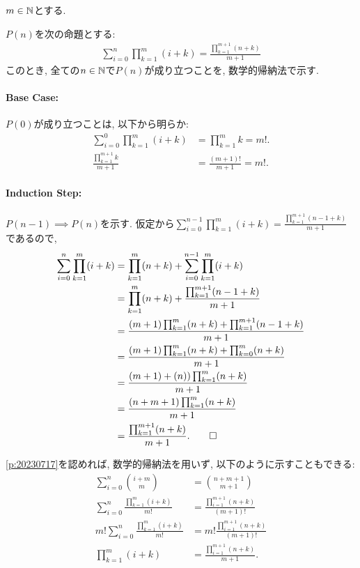 \begin{proof*}
  $m\in \mathbb{N}$とする.
  
  $P(n)$を次の命題とする:
  \begin{align*}
    \sum_{i=0}^n \prod_{k=1}^{m}(i+k)=\frac{\prod_{k=1}^{m+1}(n+k)}{m+1}
  \end{align*}
  このとき,
  全ての$n\in\mathbb{N}$で$P(n)$が成り立つことを,
  数学的帰納法で示す.

  \paragraph{Base Case:}
  $P(0)$が成り立つことは, 以下から明らか:
  \begin{align*}
    \sum_{i=0}^0 \prod_{k=1}^{m}(i+k)&=\prod_{k=1}^{m}k=m!.\\
    \frac{\prod_{k=1}^{m+1}k}{m+1}&=\frac{(m+1)!}{m+1}=m!.
  \end{align*}

  \paragraph{Induction Step:}
  $P(n-1)\implies P(n)$を示す.
  仮定から$\sum_{i=0}^{n-1} \prod_{k=1}^{m}(i+k)=\frac{\prod_{k=1}^{m+1}(n-1+k)}{m+1}$であるので,
  \begin{align*}
    \sum_{i=0}^n \prod_{k=1}^{m}(i+k)
    &=\prod_{k=1}^{m}(n+k)+\sum_{i=0}^{n-1} \prod_{k=1}^{m}(i+k)\\
    &=\prod_{k=1}^{m}(n+k)+\frac{\prod_{k=1}^{m+1}(n-1+k)}{m+1}\\
    &=\frac{(m+1)\prod_{k=1}^{m}(n+k)+\prod_{k=1}^{m+1}(n-1+k)}{m+1}\\
    &=\frac{(m+1)\prod_{k=1}^{m}(n+k)+\prod_{k=0}^{m}(n+k)}{m+1}\\
    &=\frac{(m+1)+(n))\prod_{k=1}^{m}(n+k)}{m+1}\\
    &=\frac{(n+m+1)\prod_{k=1}^{m}(n+k)}{m+1}\\
    &=\frac{\prod_{k=1}^{m+1}(n+k)}{m+1}
    .\qedhere
  \end{align*}
\end{proof*}

\begin{rem}
    \cref{p:20230717}を認めれば,
  数学的帰納法を用いず, 以下のように示すこともできる:
  \begin{align*}
    \sum_{i=0}^n \binom{i+m}{m}&=\binom{n+m+1}{m+1}\\
    \sum_{i=0}^n \frac{\prod_{k=1}^{m}(i+k)}{m!}&=\frac{\prod_{i=1}^{m+1}(n+k)}{(m+1)!}\\
    m!\sum_{i=0}^n \frac{\prod_{k=1}^{m}(i+k)}{m!}&=m!\frac{\prod_{i=1}^{m+1}(n+k)}{(m+1)!}\\
    \prod_{k=1}^{m}(i+k)&=\frac{\prod_{i=1}^{m+1}(n+k)}{m+1}.
  \end{align*}
\end{rem}


